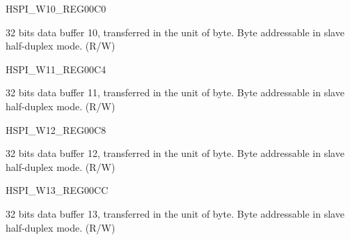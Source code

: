 \begin{register}{H}{SPI\_W10\_REG}{\hexprefix{}00C0}\label{regdesc:SPIW10REG}
%
\regnewline%
\begin{regdesc}\begin{reglist}
\label{fielddesc:SPIBUF10}\item [SPI\_BUF10] 32 bits data buffer 10, transferred in the unit of byte. Byte addressable in slave half-duplex mode. (R/W)
\end{reglist}\end{regdesc}
\end{register}


\begin{register}{H}{SPI\_W11\_REG}{\hexprefix{}00C4}\label{regdesc:SPIW11REG}
%
\regnewline%
\begin{regdesc}\begin{reglist}
\label{fielddesc:SPIBUF11}\item [SPI\_BUF11] 32 bits data buffer 11, transferred in the unit of byte. Byte addressable in slave half-duplex mode. (R/W)
\end{reglist}\end{regdesc}
\end{register}


\begin{register}{H}{SPI\_W12\_REG}{\hexprefix{}00C8}\label{regdesc:SPIW12REG}
%
\regnewline%
\begin{regdesc}\begin{reglist}
\label{fielddesc:SPIBUF12}\item [SPI\_BUF12] 32 bits data buffer 12, transferred in the unit of byte. Byte addressable in slave half-duplex mode. (R/W)
\end{reglist}\end{regdesc}
\end{register}


\begin{register}{H}{SPI\_W13\_REG}{\hexprefix{}00CC}\label{regdesc:SPIW13REG}
%
\regnewline%
\begin{regdesc}\begin{reglist}
\label{fielddesc:SPIBUF13}\item [SPI\_BUF13] 32 bits data buffer 13, transferred in the unit of byte. Byte addressable in slave half-duplex mode. (R/W)
\end{reglist}\end{regdesc}
\end{register}


